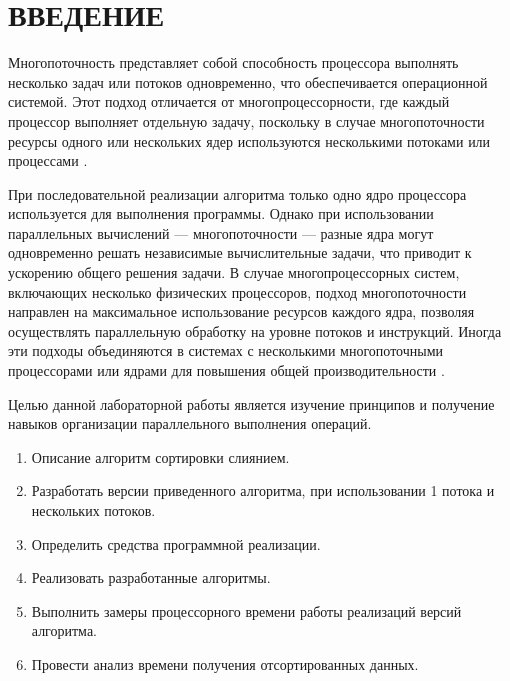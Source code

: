 \chapter*{\hfill{\centering  ВВЕДЕНИЕ}\hfill}

Многопоточность представляет собой способность процессора выполнять несколько задач или потоков одновременно, что обеспечивается операционной системой. Этот подход отличается от многопроцессорности, где каждый процессор выполняет отдельную задачу, поскольку в случае многопоточности ресурсы одного или нескольких ядер используются несколькими потоками или процессами \cite{muti-thread}.

При последовательной реализации алгоритма только одно ядро процессора используется для выполнения программы. Однако при использовании параллельных вычислений — многопоточности — разные ядра могут одновременно решать независимые вычислительные задачи, что приводит к ускорению общего решения задачи.
В случае многопроцессорных систем, включающих несколько физических процессоров, подход многопоточности направлен на максимальное использование ресурсов каждого ядра, позволяя осуществлять параллельную обработку на уровне потоков и инструкций. Иногда эти подходы объединяются в системах с несколькими многопоточными процессорами или ядрами для повышения общей производительности \cite{muti-thread}.


Целью данной лабораторной работы является изучение принципов и получение навыков организации параллельного выполнения операций.

\label{sec:targets}
\begin{enumerate}
	\item Описание алгоритм сортировки слиянием.
	\item Разработать версии  приведенного алгоритма, при использовании 1 потока и нескольких потоков.
	\item Определить средства программной реализации.
	\item Реализовать разработанные алгоритмы.
	\item Выполнить замеры процессорного времени работы реализаций версий алгоритма.
	\item Провести анализ времени получения отсортированных данных.
\end{enumerate}